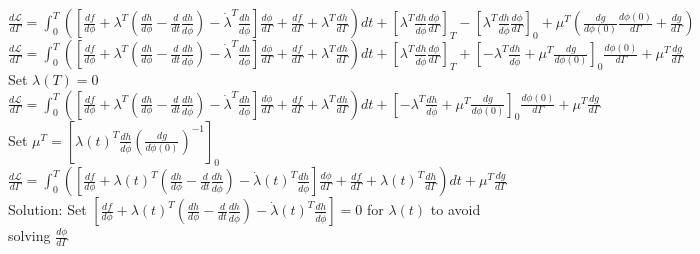 \documentclass[10pt]{article} %
\begin{document}
\begin{center}
	$\frac{d \mathcal{L}}{d\Gamma} = \int_{0}^{T} \left(\left[\frac{df}{d\phi} + \lambda^T \left( \frac{dh}{d\phi} -  \frac{d}{dt}\frac{dh}{d\dot \phi}\right) -\dot \lambda^T \frac{dh}{d\dot \phi}\right]\frac{d \phi}{d\Gamma} + \frac{df}{d\Gamma} + \lambda^T \frac{dh}{d\Gamma}\right)dt + \left[ \lambda^T \frac{dh}{d\dot \phi}\frac{d \phi}{d\Gamma} \right]_T - \left[ \lambda^T \frac{dh}{d\dot \phi}\frac{d \phi}{d\Gamma} \right]_0 + \mu^T \left( \frac{d g}{d\phi(0)} \frac{d \phi(0)}{d\Gamma} + \frac{dg}{d\Gamma} \right)$\\
	$\frac{d \mathcal{L}}{d\Gamma} = \int_{0}^{T} \left(\left[\frac{df}{d\phi} + \lambda^T \left( \frac{dh}{d\phi} -  \frac{d}{dt}\frac{dh}{d\dot \phi}\right) -\dot \lambda^T \frac{dh}{d\dot \phi}\right]\frac{d \phi}{d\Gamma} + \frac{df}{d\Gamma} + \lambda^T \frac{dh}{d\Gamma}\right)dt + \left[ \lambda^T \frac{dh}{d\dot \phi}\frac{d \phi}{d\Gamma} \right]_T + \left[- \lambda^T \frac{dh}{d\dot \phi} +\mu^T  \frac{d g}{d\phi(0)} \right]_0 \frac{d \phi(0)}{d\Gamma} + \mu^T \frac{dg}{d\Gamma}$\\$ $\\
	Set $\lambda(T) = 0$ \\
	$\frac{d \mathcal{L}}{d\Gamma} = \int_{0}^{T} \left(\left[\frac{df}{d\phi} + \lambda^T \left( \frac{dh}{d\phi} -  \frac{d}{dt}\frac{dh}{d\dot \phi}\right) -\dot \lambda^T \frac{dh}{d\dot \phi}\right]\frac{d \phi}{d\Gamma} + \frac{df}{d\Gamma} + \lambda^T \frac{dh}{d\Gamma}\right)dt + \left[- \lambda^T \frac{dh}{d\dot \phi} +\mu^T  \frac{d g}{d\phi(0)} \right]_0 \frac{d \phi(0)}{d\Gamma} + \mu^T \frac{dg}{d\Gamma}$\\$ $\\
	Set $\mu^T  = \left[ \lambda(t)^T \frac{dh}{d\dot \phi} \left( \frac{d g}{d\phi(0)} \right)^{-1} \right]_0 $ \\
	$\frac{d \mathcal{L}}{d\Gamma} = \int_{0}^{T} \left(\left[\frac{df}{d\phi} + \lambda(t)^T \left( \frac{dh}{d\phi} -  \frac{d}{dt}\frac{dh}{d\dot \phi}\right) -\dot \lambda(t)^T \frac{dh}{d\dot \phi}\right]\frac{d \phi}{d\Gamma} + \frac{df}{d\Gamma} + \lambda(t)^T \frac{dh}{d\Gamma}\right)dt + \mu^T \frac{dg}{d\Gamma}$\\$ $\\$ $\\
	Solution: Set $\left[\frac{df}{d\phi} + \lambda(t)^T \left( \frac{dh}{d\phi} -  \frac{d}{dt}\frac{dh}{d\dot \phi}\right) -\dot \lambda(t)^T \frac{dh}{d\dot \phi}\right]=0$ for $\lambda(t)$ to avoid solving $\frac{d\phi}{d\Gamma}$\\$ $\\

\end{center}
\end{document}
